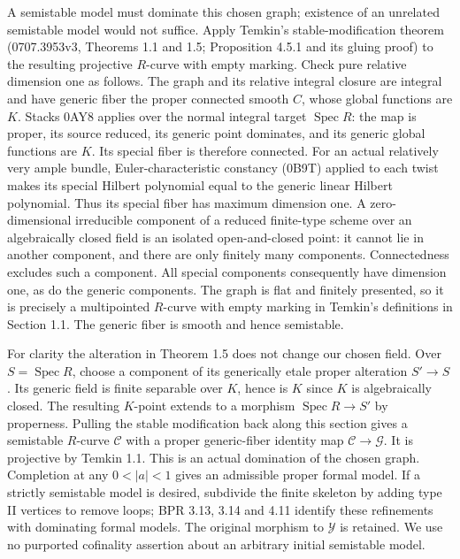 \documentclass[
  10pt,
]{article}
\begin{document}
A semistable model must dominate this chosen graph; existence of an
unrelated semistable model would not suffice. Apply Temkin's
stable-modification theorem (0707.3953v3, Theorems 1.1 and 1.5;
Proposition 4.5.1 and its gluing proof) to the resulting projective
\(R\)-curve with empty marking. Check pure relative dimension one as
follows. The graph and its relative integral closure are integral and
have generic fiber the proper connected smooth \(C\), whose global
functions are \(K\). Stacks 0AY8 applies over the normal integral target
\(\operatorname{Spec}R\): the map is proper, its source reduced, its
generic point dominates, and its generic global functions are \(K\). Its
special fiber is therefore connected. For an actual relatively very
ample bundle, Euler-characteristic constancy (0B9T) applied to each
twist makes its special Hilbert polynomial equal to the generic linear
Hilbert polynomial. Thus its special fiber has maximum dimension one. A
zero-dimensional irreducible component of a reduced finite-type scheme
over an algebraically closed field is an isolated open-and-closed point:
it cannot lie in another component, and there are only finitely many
components. Connectedness excludes such a component. All special
components consequently have dimension one, as do the generic
components. The graph is flat and finitely presented, so it is precisely
a multipointed \(R\)-curve with empty marking in Temkin's definitions in
Section 1.1. The generic fiber is smooth and hence semistable.

For clarity the alteration in Theorem 1.5 does not change our chosen
field. Over \(S=\operatorname{Spec}R\), choose a component of its
generically etale proper alteration \(S'\to S\). Its generic field is
finite separable over \(K\), hence is \(K\) since \(K\) is algebraically
closed. The resulting \(K\)-point extends to a morphism
\(\operatorname{Spec}R\to S'\) by properness. Pulling the stable
modification back along this section gives a semistable \(R\)-curve
\(\mathcal C\) with a proper generic-fiber identity map
\(\mathcal C\to\mathcal G\). It is projective by Temkin 1.1. This is an
actual domination of the chosen graph. Completion at any \(0<|a|<1\)
gives an admissible proper formal model. If a strictly semistable model
is desired, subdivide the finite skeleton by adding type II vertices to
remove loops; BPR 3.13, 3.14 and 4.11 identify these refinements with
dominating formal models. The original morphism to \(\mathcal Y\) is
retained. We use no purported cofinality assertion about an arbitrary
initial semistable model.
\end{document}
